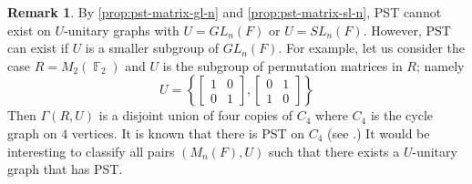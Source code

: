 \documentclass[12pt, a4paper]{amsart}
\theoremstyle{definition}
\newtheorem{rem}[thm]{Remark}
\DeclareMathOperator{\F}{\mathbb{F}}
\numberwithin{equation}{section}
\begin{document}
\begin{rem}
By \cref{prop:pst-matrix-gl-n} and \cref{prop:pst-matrix-sl-n}, PST cannot exist on $U$-unitary graphs with $U = GL_n(F)$ or $U=SL_n(F).$ However, 
    PST can exist if $U$ is a smaller subgroup of $GL_n(F)$. For example, let us consider the case $R=M_2(\F_2)$ and $U$ is the subgroup of permutation matrices in $R$; namely 
    \[ U  = \left\{ \begin{bmatrix}
        1 & 0 \\  0 & 1 
    \end{bmatrix}, \begin{bmatrix}
        0 & 1 \\  1 & 0 
    \end{bmatrix} \right \}  \]
    Then $\Gamma(R,U)$ is a disjoint union of four copies of $C_4$ where $C_4$ is the cycle graph on $4$ vertices. It is known that there is PST on $C_4$ (see \cite[Lemma 9]{bavsic2009perfect}.) It would be interesting to classify all pairs $(M_n(F), U)$ such that there exists a $U$-unitary graph that has PST. 
\end{rem}
\end{document}
